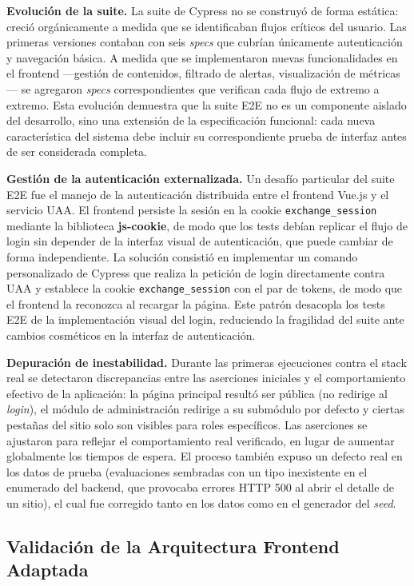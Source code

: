 \textbf{Evolución de la suite.} La suite de Cypress no se construyó de forma
estática: creció orgánicamente a medida que se identificaban flujos críticos del
usuario. Las primeras versiones contaban con seis \textit{specs} que cubrían
únicamente autenticación y navegación básica. A medida que se implementaron nuevas
funcionalidades en el frontend ---gestión de contenidos, filtrado de alertas,
visualización de métricas--- se agregaron \textit{specs} correspondientes que
verifican cada flujo de extremo a extremo. Esta evolución demuestra que la suite
E2E no es un componente aislado del desarrollo, sino una extensión de la
especificación funcional: cada nueva característica del sistema debe incluir su
correspondiente prueba de interfaz antes de ser considerada completa.

\textbf{Gestión de la autenticación externalizada.} Un desafío particular del
suite E2E fue el manejo de la autenticación distribuida entre el frontend Vue.js y
el servicio UAA. El frontend persiste la sesión en la cookie \texttt{exchange\_session}
mediante la biblioteca \textbf{js-cookie}, de modo que los tests debían replicar el
flujo de login sin depender de la interfaz visual de autenticación, que puede
cambiar de forma independiente. La solución consistió en implementar un comando
personalizado de Cypress que realiza la petición de login directamente contra UAA
y establece la cookie \texttt{exchange\_session} con el par de tokens, de modo que
el frontend la reconozca al recargar la página. Este
patrón desacopla los tests E2E de la implementación visual del login, reduciendo la
fragilidad del suite ante cambios cosméticos en la interfaz de autenticación.

\textbf{Depuración de inestabilidad.} Durante las primeras ejecuciones contra el
stack real se detectaron discrepancias entre las aserciones iniciales y el
comportamiento efectivo de la aplicación: la página principal resultó ser pública
(no redirige al \textit{login}), el módulo de administración redirige a su submódulo
por defecto y ciertas pestañas del sitio solo son visibles para roles específicos.
Las aserciones se ajustaron para reflejar el comportamiento real verificado, en
lugar de aumentar globalmente los tiempos de espera. El proceso también expuso un
defecto real en los datos de prueba (evaluaciones sembradas con un tipo inexistente
en el enumerado del backend, que provocaba errores HTTP 500 al abrir el detalle de
un sitio), el cual fue corregido tanto en los datos como en el generador del
\textit{seed}.

\subsection{Validación de la Arquitectura Frontend Adaptada}


